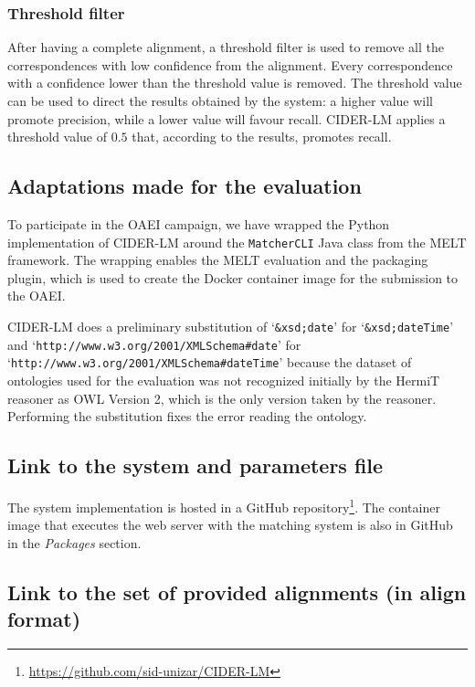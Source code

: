\documentclass[
]{ceurart}
\begin{document}
\subsubsection{Threshold filter}

After having a complete alignment, a threshold filter is used to remove all the correspondences with low confidence from the alignment. Every correspondence with a confidence lower than the threshold value is removed. The threshold value can be used to direct the results obtained by the system: a higher value will promote precision, while a lower value will favour recall. CIDER-LM applies a threshold value of $0.5$ that, according to the results, promotes recall.

\subsection{Adaptations made for the evaluation}

To participate in the OAEI campaign, we have wrapped the Python implementation of CIDER-LM around the \verb|MatcherCLI| Java class from the MELT framework. The wrapping enables the MELT evaluation and the packaging plugin, which is used to create the Docker container image for the submission to the OAEI.

CIDER-LM does a preliminary substitution of `\verb|&xsd;date|' for `\verb|&xsd;dateTime|' and `\verb|http://www.w3.org/2001/XMLSchema#date|' for `\verb|http://www.w3.org/2001/XMLSchema#dateTime|' because the dataset of ontologies used for the evaluation was not recognized initially by the HermiT reasoner as OWL Version 2, which is the only version taken by the reasoner. Performing the substitution fixes the error reading the ontology.

\subsection{Link to the system and parameters file}\label{sec:system-link}

The system implementation is hosted in a GitHub repository\footnote{\url{https://github.com/sid-unizar/CIDER-LM}}. The container image that executes the web server with the matching system is also in GitHub in the \textit{Packages} section. 

\subsection{Link to the set of provided alignments (in align format)}
\end{document}
